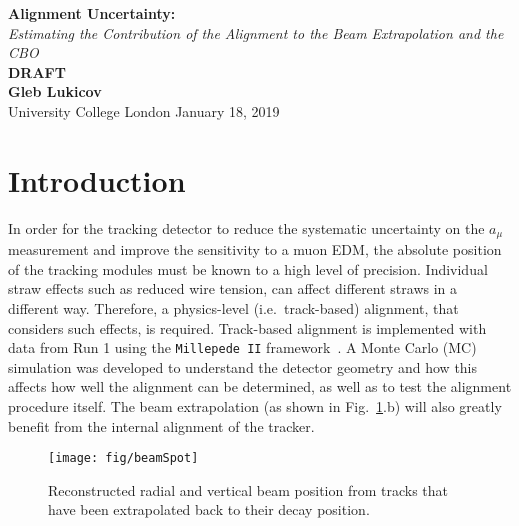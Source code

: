 \documentclass[a4paper,11pt]{article}
\begin{document}
\thispagestyle{empty}
\begin{titlepage}
\begin{center}
\end{center}
\begin{center}
    \vspace{1cm}
    {\huge \textbf{Alignment Uncertainty:} \\ \textit{Estimating the Contribution of the Alignment to the Beam Extrapolation and the CBO} }\\
    \vspace{1.5cm}
    {\Huge \textbf{ DRAFT }}\\
    \vspace{6cm}
    {\LARGE\bf Gleb Lukicov}\\
    {\Large University College London}
    \vspace{4cm}
    \vfill
    \vspace{0.9cm}
    {\large January 18, 2019}
\end{center}
\end{titlepage}
\clearpage

\thispagestyle{plain}

\clearpage
\section{Introduction}

In order for the tracking detector to reduce the systematic uncertainty on the $a_{\mu}$ measurement and improve the sensitivity to a muon EDM, the absolute position of the tracking modules must be known to a high level of precision. Individual straw effects such as reduced wire tension, can affect different straws in a different way. Therefore, a physics-level (i.e.~track-based) alignment, that considers such effects, is required. Track-based alignment is implemented with data from Run 1 using the \texttt{Millepede II} framework~\cite{mp2}. A Monte Carlo (MC) simulation was developed to understand the detector geometry and how this affects how well the alignment can be determined, as well as to test the alignment procedure itself. The beam extrapolation (as shown in Fig.~\ref{fig:beamSpot}.b) will also greatly benefit from the internal alignment of the tracker.
\begin{figure}[ht!]
    \centering
    \texttt{[image: fig/beamSpot]}
    \vspace{-8pt}
    \caption{Reconstructed radial and vertical beam position from tracks that have been extrapolated back to their decay position.}
    \label{fig:beamSpot}
\end{figure}




\clearpage


\nocite{*}
\thispagestyle{plain}

\end{document}
